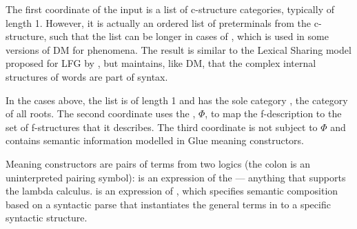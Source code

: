\documentclass[output=paper,hidelinks]{langscibook}
\begin{document}
\z
\begin{sloppypar}
  \noindent
  The first coordinate of the input is a list of c-structure
  categories, typically of length 1. However, it is actually an
  ordered list of preterminals from the c-structure, such that the
  list can be longer in cases of 
  \citep{ramchand08,HaSi16,Sve16b,Mer15}, which is used in some versions of DM for
   phenomena. The result is similar to the Lexical
  Sharing model proposed for LFG by 
  \citet{wescoat2002,wescoat2005,wescoat2007}, but maintains, like DM,
  that the complex internal structures of words are part of syntax.
\end{sloppypar}

In the cases above, the list is of
length 1 and has the sole category \dmroot, the category of all
roots. The second coordinate uses the ,
$\Phi$, to map the f-description to the set of f-structures that it
describes. The third coordinate is not subject to $\Phi$ and contains
semantic information modelled in Glue meaning constructors.


Meaning constructors are pairs of terms from two logics (the colon
is an uninterpreted pairing symbol):
\ea
{}
\z
%
 is an expression of the 
--- anything that supports the lambda calculus.   is an
expression of  \citep{girard1987}, which specifies
semantic composition based on a syntactic parse that instantiates the
general terms in  to a specific syntactic structure.
\end{document}
